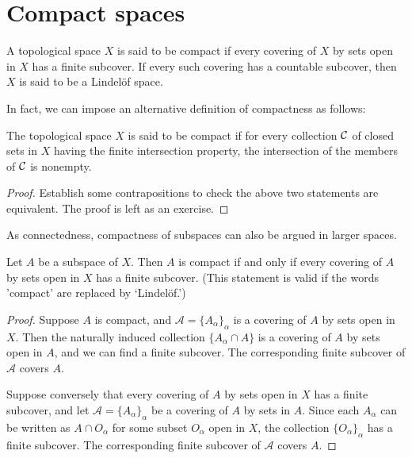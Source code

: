 \section{Compact spaces}

\begin{defi}
    A topological space $X$ is said to be compact if every covering of $X$ by sets open in $X$ has a finite subcover.
    If every such covering has a countable subcover, then $X$ is said to be a Lindel\"{o}f space.
\end{defi}
\begin{rmk}
    In fact, we can impose an alternative definition of compactness as follows:
    \begin{center}
        The topological space $X$ is said to be compact if for every collection ${\mathcal{C}}$ of closed sets in $X$ having the finite intersection property, the intersection of the members of ${\mathcal{C}}$ is nonempty. 
    \end{center}
\end{rmk}
\begin{proof}
    Establish some contrapositions to check the above two statements are equivalent.
    The proof is left as an exercise.
\end{proof}

As connectedness, compactness of subspaces can also be argued in larger spaces.
\begin{thm}
    Let $A$ be a subspace of $X$.
    Then $A$ is compact if and only if every covering of $A$ by sets open in $X$ has a finite subcover.
    (This statement is valid if the words 'compact' are replaced by `Lindel\"{o}f.')
\end{thm}
\begin{proof}
    Suppose $A$ is compact, and $\mathcal{A}=\{A_\alpha\}_\alpha$ is a covering of $A$ by sets open in $X$.
    Then the naturally induced collection $\{A_\alpha\cap A\}$ is a covering of $A$ by sets open in $A$, and we can find a finite subcover.
    The corresponding finite subcover of $\mathcal{A}$ covers $A$.

    Suppose conversely that every covering of $A$ by sets open in $X$ has a finite subcover, and let $\mathcal{A}=\{A_\alpha\}_\alpha$ be a covering of $A$ by sets in $A$.
    Since each $A_\alpha$ can be written as $A\cap O_\alpha$ for some subset $O_\alpha$ open in $X$, the collection $\{O_\alpha\}_\alpha$ has a finite subcover.
    The corresponding finite subcover of $\mathcal{A}$ covers $A$.
\end{proof}

